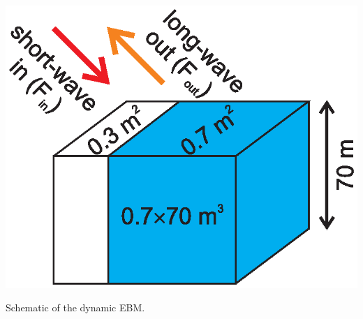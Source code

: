 \documentclass{tufte-book} %
\begin{document}
\begin{marginfigure}[-5.0in]
\includegraphics[width=\linewidth]{ch8-ebm.eps}
\caption{Schematic of the dynamic EBM.}
\label{fig:ch8-ebm}
\end{marginfigure}
\end{document}
